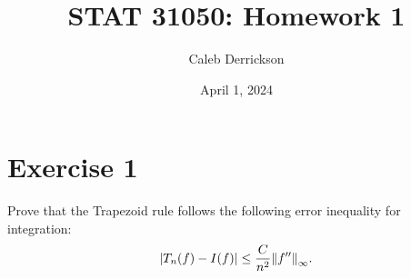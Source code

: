 

\title{STAT 31050: Homework 1}
\author{Caleb Derrickson}
\date{April 1, 2024}


\onehalfspacing
\maketitle
\allowdisplaybreaks

\tableofcontents

\newcommand{\barP}{\Bar{P}}
\newcommand{\barQ}{\Bar{Q}}
\renewcommand{\braket}[2]{\langle #1, #2 \rangle}

\newpage
\section{Exercise 1}
Prove that the Trapezoid rule follows the following error inequality for integration:
\[|T_n(f) - I(f)| \leq \frac{C}{n^2}\norm{f''}_\infty.\]
\partbreak
